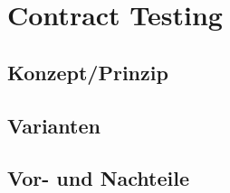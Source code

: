 \chapter{Contract Testing}\label{ch:contractTesting}

\section{Konzept/Prinzip}\label{sec:contracttesting_concept}

\section{Varianten}\label{sec:contracttesting_variants}

\section{Vor- und Nachteile}\label{sec:contracttesting_proscons}